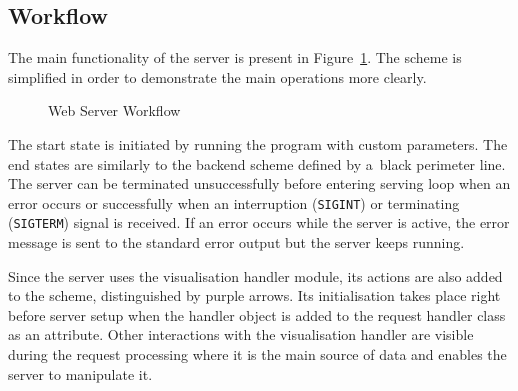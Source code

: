 \subsection{Workflow}
The main functionality of the server is present in Figure~\ref{fig:server}.
The scheme is simplified in order to demonstrate the main operations more clearly.

\begin{figure}[H]
   \begin{center}
		 \hfill
      \caption{Web Server Workflow} \label{fig:server}
	\end{center}
\end{figure}

The start state is initiated by running the program with custom parameters.
The end states are similarly to the backend scheme defined by a~black
perimeter line. The server can be terminated unsuccessfully before entering
serving loop when an error occurs or successfully when an interruption (\texttt{SIGINT})
or terminating (\texttt{SIGTERM}) signal is received. If an error occurs while
the server is active, the error message is sent to the standard error output
but the server keeps running.

Since the server uses the visualisation handler module, its actions are also added
to the scheme, distinguished by purple arrows. Its initialisation takes place
right before server setup when the handler object is added to the request handler
class as an attribute. Other interactions with the visualisation handler are
visible during the request processing where it is the main source of
data and enables the server to manipulate it.


